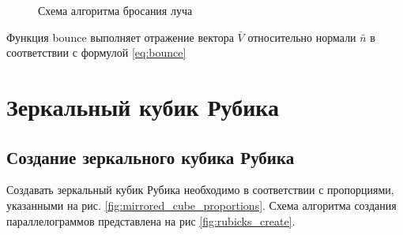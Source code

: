 \documentclass[a4paper, 14pt]{report} %
\begin{document}
	\begin{figure}[!ht]
		\caption{Схема алгоритма бросания луча}
		\label{fig:throw_ray}
	\end{figure}

	

	Функция bounce выполняет отражение вектора $\bar V$ относительно нормали $\bar n$ в соответствии с формулой \ref{eq:bounce}
	\section{Зеркальный кубик Рубика}
	\subsection{Создание зеркального кубика Рубика}
	Создавать зеркальный кубик Рубика необходимо в соответствии с пропорциями, указанными на рис. \ref{fig:mirrored_cube_proportions}. Схема алгоритма создания параллелограммов представлена на рис \ref{fig:rubicks_create}.
	
\end{document}
